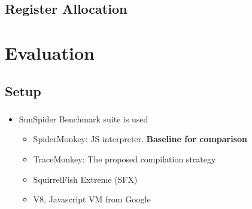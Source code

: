 \documentclass[mathserif,10pt]{beamer}
\newcommand{\cmt}[1]{}
\begin{document}
\subsection{Register Allocation}
\frame
{
  \frametitle{\subsecname}
  \begin{figure}[h]
  \centering
  \end{figure}
}

\section{Evaluation}
\subsection{Setup}
\frame
{
  \frametitle{\subsecname}
  \begin{itemize}
    \item SunSpider Benchmark suite is used
    \begin{itemize}
        \item SpiderMonkey: JS interpreter. \textbf{Baseline for comparison}
        \item TraceMonkey: The proposed compilation strategy
        \item SquirrelFish Extreme (SFX)
                                          \cmt{
        : Call threaded JS interpreter
                                          }
        \item V8, Javascript VM from Google
          \cmt{
            : Method compiling JS VM
          }
    \end{itemize}
  \end{itemize}
}
\end{document}
